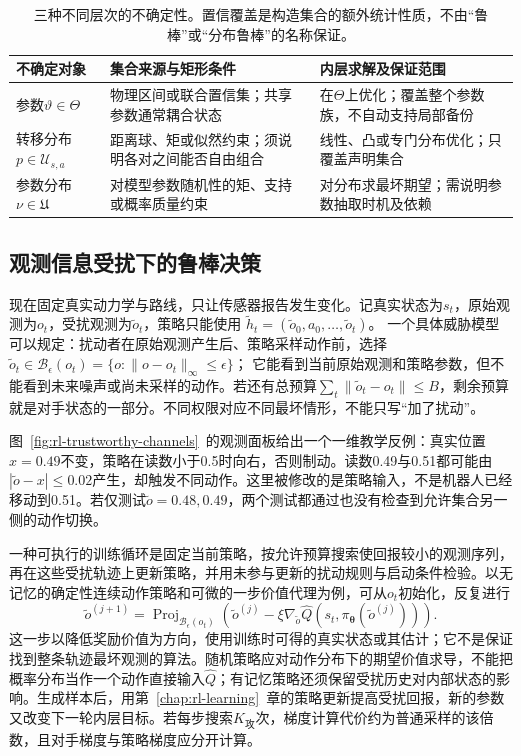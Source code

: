 \begin{table}[htbp]
  \centering
  \begin{tabularx}{\linewidth}{@{}>{\raggedright\arraybackslash}p{20mm}XX@{}}
    \toprule
    不确定对象 & 集合来源与矩形条件 & 内层求解及保证范围 \\
    \midrule
    参数$\vartheta\in\Theta$ & 物理区间或联合置信集；共享参数通常耦合状态 & 在$\Theta$上优化；覆盖整个参数族，不自动支持局部备份 \\
    转移分布$p\in\mathcal U_{s,a}$ & 距离球、矩或似然约束；须说明各对之间能否自由组合 & 线性、凸或专门分布优化；只覆盖声明集合 \\
    参数分布$\nu\in\mathfrak U$ & 对模型参数随机性的矩、支持或概率质量约束 & 对分布求最坏期望；需说明参数抽取时机及依赖 \\
    \bottomrule
  \end{tabularx}
  \caption{三种不同层次的不确定性。置信覆盖是构造集合的额外统计性质，不由“鲁棒”或“分布鲁棒”的名称保证。}
  \label{tab:rl-trustworthy-uncertainty}
\end{table}

\subsection{观测信息受扰下的鲁棒决策}
\label{sec:rl-trustworthy-observation}

现在固定真实动力学与路线，只让传感器报告发生变化。记真实状态为$s_t$，原始观测为$o_t$，受扰观测为$\widetilde o_t$，策略只能使用
$\widetilde h_t=(\widetilde o_0,a_0,\ldots,\widetilde o_t)$。
一个具体威胁模型可以规定：扰动者在原始观测产生后、策略采样动作前，选择
$\widetilde o_t\in\mathcal B_\epsilon(o_t)=\{o:\lVert o-o_t\rVert_\infty\leq\epsilon\}$；
它能看到当前原始观测和策略参数，但不能看到未来噪声或尚未采样的动作。若还有总预算$\sum_t\lVert\widetilde o_t-o_t\rVert\leq B$，剩余预算就是对手状态的一部分。不同权限对应不同最坏情形，不能只写“加了扰动”。

图~\ref{fig:rl-trustworthy-channels}~的观测面板给出一个一维教学反例：真实位置$x=0.49$不变，策略在读数小于0.5时向右，否则制动。读数0.49与0.51都可能由$|\widetilde o-x|\leq0.02$产生，却触发不同动作。这里被修改的是策略输入，不是机器人已经移动到0.51。若仅测试$\widetilde o=0.48,0.49$，两个测试都通过也没有检查到允许集合另一侧的动作切换。

一种可执行的训练循环是固定当前策略，按允许预算搜索使回报较小的观测序列，再在这些受扰轨迹上更新策略，并用未参与更新的扰动规则与启动条件检验。以无记忆的确定性连续动作策略和可微的一步价值代理为例，可从$o_t$初始化，反复进行
\[
  \widetilde o^{(j+1)}
   =\operatorname{Proj}_{\mathcal B_\epsilon(o_t)}
      \left(\widetilde o^{(j)}
       -\xi\nabla_{\widetilde o}
          \widehat Q(s_t,\pi_{\bm{\theta}}(\widetilde o^{(j)}))\right).
\]
这一步以降低奖励价值为方向，使用训练时可得的真实状态或其估计；它不是保证找到整条轨迹最坏观测的算法。随机策略应对动作分布下的期望价值求导，不能把概率分布当作一个动作直接输入$\widehat Q$；有记忆策略还须保留受扰历史对内部状态的影响。生成样本后，用第~\ref{chap:rl-learning}~章的策略更新提高受扰回报，新的参数又改变下一轮内层目标。若每步搜索$K_{\text{攻}}$次，梯度计算代价约为普通采样的该倍数，且对手梯度与策略梯度应分开计算。

